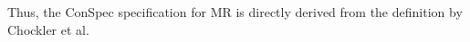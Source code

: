 \documentclass{sig-alternate-05-2015}
\begin{document}
  Thus, the ConSpec specification for MR is directly derived from the definition by Chockler et al.
\end{document}
